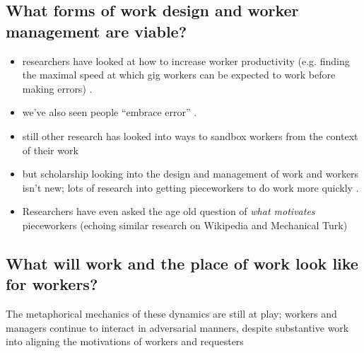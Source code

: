 \documentclass[trackingWork]{subfiles}
\begin{document}
\subsection{What forms of work design and worker management are viable?}
\begin{itemize}
  \item researchers have looked at how to increase worker productivity
  (e.g. finding the maximal speed at which gig workers can be expected to work before making errors)
  \cite{measuringCrowdsourcingCheng}.
  \item we've also seen people ``embrace error''
  \cite{embracingErrorKrishna}.
  \item still other research has looked into ways to sandbox workers from the context of their work 
  \item but scholarship looking into the design and management of work and workers isn't new;
  lots of research into getting pieceworkers to do work more quickly
  \cite{seymour1954manual}.
  \item Researchers have even asked the age old question of \textit{what motivates} pieceworkers
  (echoing similar research on Wikipedia and Mechanical Turk)
  \cite{roy1953work,Nov:2007:MW:1297797.1297798,kaufmann2011more}
\end{itemize}


\subsection{What will work and the place of work look like for workers?}
The metaphorical mechanics of these dynamics are still at play;
workers and managers continue to interact in adversarial manners,
despite substantive work into aligning the motivations of workers and requesters
\end{document}
